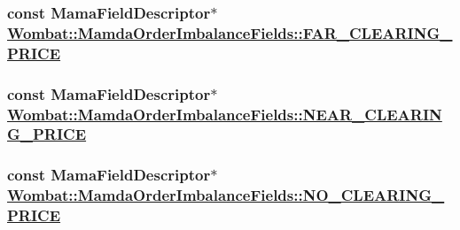 \hypertarget{classWombat_1_1MamdaOrderImbalanceFields_2d9e961d7cc4bf8e8a31ad1aef2335e6}{
\subsubsection[FAR\_\-CLEARING\_\-PRICE]{\setlength{\rightskip}{0pt plus 5cm}const Mama\-Field\-Descriptor$\ast$ \hyperlink{classWombat_1_1MamdaOrderImbalanceFields_2d9e961d7cc4bf8e8a31ad1aef2335e6}{Wombat::Mamda\-Order\-Imbalance\-Fields::FAR\_\-CLEARING\_\-PRICE}}}
\label{classWombat_1_1MamdaOrderImbalanceFields_2d9e961d7cc4bf8e8a31ad1aef2335e6}


\hypertarget{classWombat_1_1MamdaOrderImbalanceFields_156c8d50747b4126222a48384f0df576}{
\subsubsection[NEAR\_\-CLEARING\_\-PRICE]{\setlength{\rightskip}{0pt plus 5cm}const Mama\-Field\-Descriptor$\ast$ \hyperlink{classWombat_1_1MamdaOrderImbalanceFields_156c8d50747b4126222a48384f0df576}{Wombat::Mamda\-Order\-Imbalance\-Fields::NEAR\_\-CLEARING\_\-PRICE}}}
\label{classWombat_1_1MamdaOrderImbalanceFields_156c8d50747b4126222a48384f0df576}


\hypertarget{classWombat_1_1MamdaOrderImbalanceFields_317e693301c1150ea28a6f7514b8edbb}{
\subsubsection[NO\_\-CLEARING\_\-PRICE]{\setlength{\rightskip}{0pt plus 5cm}const Mama\-Field\-Descriptor$\ast$ \hyperlink{classWombat_1_1MamdaOrderImbalanceFields_317e693301c1150ea28a6f7514b8edbb}{Wombat::Mamda\-Order\-Imbalance\-Fields::NO\_\-CLEARING\_\-PRICE}}}
\label{classWombat_1_1MamdaOrderImbalanceFields_317e693301c1150ea28a6f7514b8edbb}


